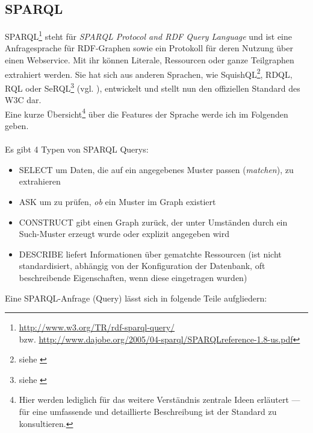 \subsection{SPARQL}
\label{sec:sparql}
SPARQL\footnote{\url{http://www.w3.org/TR/rdf-sparql-query/} \\
bzw. \url{http://www.dajobe.org/2005/04-sparql/SPARQLreference-1.8-us.pdf}} steht für \emph{SPARQL Protocol and RDF Query Language} und ist eine Anfragesprache für RDF-Graphen sowie ein Protokoll für deren Nutzung über einen Webservice. Mit ihr können Literale, Ressourcen oder ganze Teilgraphen extrahiert werden. Sie hat sich aus anderen Sprachen, wie SquishQL\footnote{siehe \cite{squishQL}}, RDQL, RQL oder SeRQL\footnote{siehe \cite{serql}} (vgl. \cite{compQL}), entwickelt und stellt nun den offiziellen Standard des W3C dar.\\
Eine kurze Übersicht\footnote{Hier werden lediglich für das weitere Verständnis zentrale Ideen erläutert --- für eine umfassende und detaillierte Beschreibung ist der Standard zu konsultieren.} über die Features der Sprache werde ich im Folgenden geben.\\
\vspace{0.1cm}\\
Es gibt 4 Typen von SPARQL Querys:
\begin{itemize}
	\item{SELECT um Daten, die auf ein angegebenes Muster passen (\emph{matchen}), zu extrahieren}
	\item{ASK um zu prüfen, \emph{ob} ein Muster im Graph existiert}
	\item{CONSTRUCT gibt einen Graph zurück, der unter Umständen durch ein Such-Muster erzeugt wurde oder explizit angegeben wird}
	\item{DESCRIBE liefert Informationen über gematchte Ressourcen (ist nicht standardisiert, abhängig von der Konfiguration der Datenbank, oft beschreibende Eigenschaften, wenn diese eingetragen wurden)}
\end{itemize}
Eine SPARQL-Anfrage (Query) lässt sich in folgende Teile aufgliedern:
